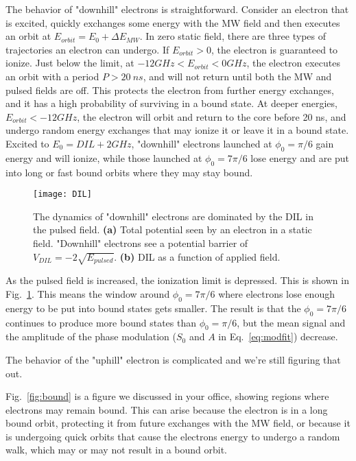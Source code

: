 \documentclass[aps,pra,preprint,groupedaddress]{revtex4-1}
\begin{document}
The behavior of "downhill" electrons is straightforward. Consider an electron that is excited, quickly exchanges some energy with the MW field and then executes an orbit at $E_{orbit} = E_0 + \Delta E_{MW}$. In zero static field, there are three types of trajectories an electron can undergo. If $E_{orbit} > 0$, the electron is guaranteed to ionize. Just below the limit, at $ -12 GHz < E_{orbit} < 0 GHz$, the electron executes an orbit with a period $P > 20 ~ ns$, and will not return until both the MW and pulsed fields are off. This protects the electron from further energy exchanges, and it has a high probability of surviving in a bound state. At deeper energies, $E_{orbit} < -12 GHz$, the electron will orbit and return to the core before 20 ns, and undergo random energy exchanges that may ionize it or leave it in a bound state. Excited to $E_0 = DIL + 2 GHz$, "downhill" electrons launched at $\phi_0 = \pi/6$ gain energy and will ionize, while those launched at $\phi_0 = 7\pi/6$ lose energy and are put into long or fast bound orbits where they may stay bound.

\begin{figure}
	\texttt{[image: DIL]}
	\caption{\label{fig:DIL} The dynamics of "downhill" electrons are dominated by the DIL in the pulsed field. \textbf{(a)} Total potential seen by an electron in a static field. "Downhill" electrons see a potential barrier of $V_{DIL} = -2\sqrt{E_{pulsed}}$. \textbf{(b)} DIL as a function of applied field.}
\end{figure}


As the pulsed field is increased, the ionization limit is depressed. This is shown in Fig.~\ref{fig:DIL}. This means the window around $\phi_0 = 7\pi/6$ where electrons lose enough energy to be put into bound states gets smaller. The result is that the $\phi_0 = 7\pi/6$ continues to produce more bound states than $\phi_0 = \pi/6$, but the mean signal and the amplitude of the phase modulation ($S_0$ and $A$ in Eq.~\ref{eq:modfit}) decrease.

The behavior of the "uphill" electron is complicated and we're still figuring that out.

Fig.~\ref{fig:bound} is a figure we discussed in your office, showing regions where electrons may remain bound. This can arise because the electron is in a long bound orbit, protecting it from future exchanges with the MW field, or because it is undergoing quick orbits that cause the electrons energy to undergo a random walk, which may or may not result in a bound orbit.
\end{document}
